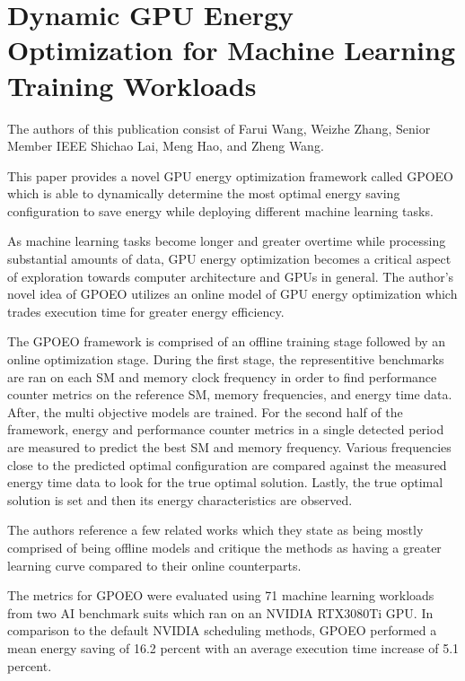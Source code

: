 \section{Dynamic GPU Energy Optimization for Machine Learning Training Workloads}\label{sec:paper3}

The authors of this publication consist of Farui Wang, Weizhe Zhang, Senior Member IEEE Shichao Lai, Meng Hao, and Zheng Wang.

This paper provides a novel GPU energy optimization framework called GPOEO which is able to dynamically determine the most optimal energy saving configuration to save energy while deploying different machine learning tasks.  

As machine learning tasks become longer and greater overtime while processing substantial amounts of data, GPU energy optimization becomes a critical aspect of exploration towards computer architecture and GPUs in general.  
The author's novel idea of GPOEO utilizes an online model of GPU energy optimization which trades execution time for greater energy efficiency.  

The GPOEO framework is comprised of an offline training stage followed by an online optimization stage. During the first stage, the representitive benchmarks are ran on each SM and memory clock frequency in order to find performance counter metrics on the reference SM, memory frequencies, and energy time data. After, the multi objective models are trained. For the second half of the framework, energy and performance counter metrics in a single detected period are measured to predict the best SM and memory frequency. Various frequencies close to the predicted optimal configuration are compared against the measured energy time data to look for the true optimal solution. Lastly, the true optimal solution is set and then its energy characteristics are observed. 

The authors reference a few related works which they state as being mostly comprised of being offline models and critique the methods as having a greater learning curve compared to their online counterparts. 

The metrics for GPOEO were evaluated using 71 machine learning workloads from two AI benchmark suits which ran on an NVIDIA RTX3080Ti GPU. In comparison to the default NVIDIA scheduling methods, GPOEO performed a mean energy saving of 16.2 percent with an average execution time increase of 5.1 percent.